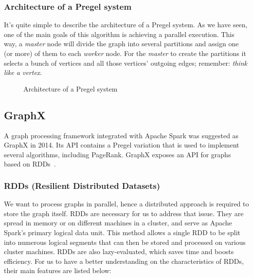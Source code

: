 \subsubsection{Architecture of a Pregel system}

It's quite simple to describe the architecture of a Pregel system. As we have seen, one of the main goals of this algorithm is achieving a parallel execution. This way, a \textit{master} node will divide the graph into several partitions and assign one (or more) of them to each \textit{worker} node. For the \textit{master} to create the partitions it selects a bunch of vertices and all those vertices' outgoing edges; remember: \textit{think like a vertex}.

\begin{figure}[H]
    \centering
    
    \caption[Architecture of a Pregel system]{Architecture of a Pregel system~\cite{10.1145/3349265}}
    \label{fig:architecture:pregel}
\end{figure}

\subsection{GraphX}

A graph processing framework integrated with Apache Spark was suggested as GraphX in 2014. Its API contains a Pregel variation that is used to implement several algorithms, including PageRank. GraphX exposes an API for graphs based on RDDs~\cite{https://doi.org/10.48550/arxiv.2110.11709}.

\subsubsection{RDDs (Resilient Distributed Datasets)}

We want to process graphs in parallel, hence a distributed approach is required to store the graph itself. RDDs are necessary for us to address that issue. They are spread in memory or on different machines in a cluster, and serve as Apache Spark's primary logical data unit. This method allows a single RDD to be split into numerous logical segments that can then be stored and processed on various cluster machines. RDDs are also lazy-evaluated, which saves time and boosts efficiency. For us to have a better understanding on the characteristics of RDDs, their main features are listed below:

